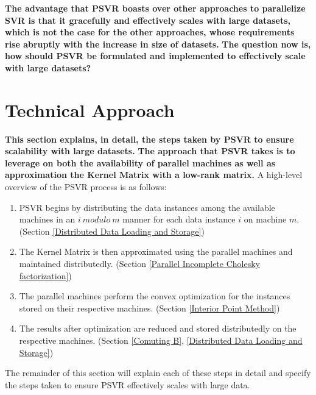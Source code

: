 \documentclass[12pt]{article}
\begin{document}
\newline\newline
{\bf The advantage that PSVR boasts over other approaches to parallelize SVR is that it gracefully and effectively scales with large datasets, which is not the case for the other approaches, whose requirements rise abruptly with the increase in size of datasets.} 
\newline\newline
{\bf The question now is, how should PSVR be formulated and implemented to effectively scale with large datasets?}
\cleardoublepage
 \section{Technical Approach}
 \label{Technical Approach}
 {\bf This section explains, in detail, the steps taken by PSVR to ensure scalability with large datasets.}
 \newline\newline
{\bf The approach that PSVR takes is to leverage on both the availability of parallel machines as well as approximation the Kernel Matrix with a low-rank matrix.}
\newline\newline
A high-level overview of the PSVR process is as follows:
\begin{enumerate}
\item PSVR begins by distributing the data instances among the available machines in an $i\ modulo\ m$ manner for each data instance $i$ on machine $m$. (Section \ref{Distributed Data Loading and Storage})
\item The Kernel Matrix is then approximated using the parallel machines and maintained distributedly. (Section \ref{Parallel Incomplete Cholesky factorization})
\item The parallel machines perform the convex optimization for the instances stored on their respective machines. (Section \ref{Interior Point Method})
\item The results after optimization are reduced and stored distributedly on the respective machines. (Section \ref{Comuting B},  \ref{Distributed Data Loading and Storage})
\end{enumerate}
 The remainder of this section will explain each of these steps in detail and specify the steps taken to ensure PSVR effectively scales with large data.
\end{document}
